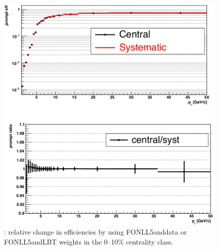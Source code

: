 \begin{figure}[tb]
\begin{center}
 \includegraphics[width=1\textwidth]{figures/Dstar/pp13TeV/MCpTShape_syst.png}
\caption{\Dstar : relative change in efficiencies by using FONLL5anddata or FONLL5andLBT weights in the 0--10\% centrality class.}
\label{fig:DstarPtWeights010}
\end{center}
\end{figure}



